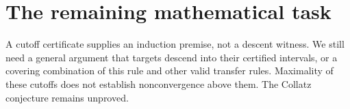 \documentclass[10pt]{article}
\begin{document}
\section*{The remaining mathematical task}
A cutoff certificate supplies an induction premise, not a descent witness. We still need a general argument that targets descend into their certified intervals, or a covering combination of this rule and other valid transfer rules. Maximality of these cutoffs does not establish nonconvergence above them. The Collatz conjecture remains unproved.
\end{document}
